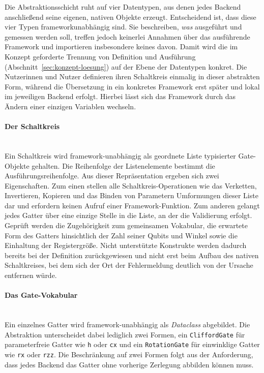 Die Abstraktionsschicht ruht auf vier Datentypen, aus denen jedes Backend
anschließend seine eigenen, nativen Objekte erzeugt. Entscheidend ist, dass
diese vier Typen frameworkunabhängig sind. Sie beschreiben, \textit{was}
ausgeführt und gemessen werden soll, treffen jedoch keinerlei Annahmen über das
ausführende Framework und importieren insbesondere keines davon. Damit wird die
im Konzept geforderte Trennung von Definition und Ausführung
(Abschnitt~\ref{sec:konzept-loesung}) auf der Ebene der Datentypen konkret. Die
Nutzerinnen und Nutzer definieren ihren Schaltkreis einmalig in dieser abstrakten Form, während die Übersetzung in ein konkretes Framework erst später und lokal im jeweiligen Backend erfolgt. Hierbei lässt sich das Framework durch das Ändern einer einzigen Variablen wechseln.

\paragraph*{Der Schaltkreis}\mbox{}\\
\label{par:datentypen-schaltkreis}
Ein Schaltkreis wird framework-unabhängig als geordnete Liste typisierter
Gate-Objekte gehalten. Die Reihenfolge der Listenelemente bestimmt die
Ausführungsreihenfolge. Aus dieser Repräsentation ergeben sich zwei
Eigenschaften. Zum einen stellen alle Schaltkreis-Operationen wie das Verketten,
Invertieren, Kopieren und das Binden von Parametern Umformungen dieser Liste dar
und erfordern keinen Aufruf einer Framework-Funktion. Zum anderen gelangt jedes
Gatter über eine einzige Stelle in die Liste, an der die Validierung erfolgt.
Geprüft werden die Zugehörigkeit zum gemeinsamen Vokabular, die erwartete Form
des Gatters hinsichtlich der Zahl seiner Qubits und Winkel sowie die Einhaltung
der Registergröße. Nicht unterstützte Konstrukte werden dadurch bereits bei der
Definition zurückgewiesen und nicht erst beim Aufbau des nativen Schaltkreises,
bei dem sich der Ort der Fehlermeldung deutlich von der Ursache entfernen würde.

\paragraph*{Das Gate-Vokabular}\mbox{}\\
\label{par:datentypen-vokabular}
Ein einzelnes Gatter wird framework-unabhängig als \textit{Dataclass}
abgebildet. Die Abstraktion unterscheidet dabei lediglich zwei Formen, ein
\texttt{CliffordGate} für parameterfreie Gatter wie \texttt{h} oder \texttt{cx}
und ein \texttt{RotationGate} für einwinklige Gatter wie \texttt{rx} oder
\texttt{rzz}. Die Beschränkung auf zwei Formen folgt aus der Anforderung, dass jedes
Backend das Gatter ohne vorherige Zerlegung abbilden können muss.

